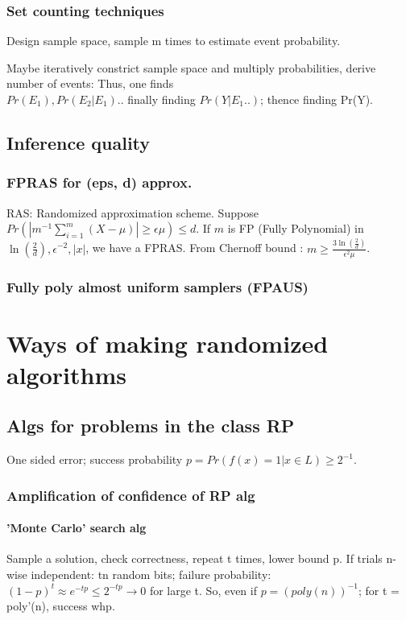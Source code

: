 \documentclass[oneside, article]{memoir}
\begin{document}
\subsection{Set counting techniques}
Design sample space, sample m times to estimate event probability.

Maybe iteratively constrict sample space and multiply probabilities, derive number of events: Thus, one finds \\$Pr(E_{1}), Pr(E_{2}| E_{1}) ..$ finally finding $Pr(Y|E_{1} .. )$; thence finding Pr(Y).

\section{Inference quality}
\subsection{FPRAS for (eps, d) approx.}
RAS: Randomized approximation scheme. Suppose $Pr(|m^{-1}\sum^{m}_{i=1} (X-\mu)|\geq \epsilon \mu) \leq d$. If $m$ is FP (Fully Polynomial) in $\ln(\frac{2}{d}), \epsilon^{-2}, |x|$, we have a FPRAS. From Chernoff bound : $m \geq \frac{3\ln(\frac{2}{d})}{\epsilon^{2}\mu}$.

\subsection{Fully poly almost uniform samplers (FPAUS)}
\tbc

\chapter{Ways of making randomized algorithms}
\section{Algs for problems in the class RP}
One sided error; success probability $p = Pr(f(x) = 1|x\in L) \geq 2^{-1}$.

\subsection{Amplification of confidence of RP alg}

\subsubsection{'Monte Carlo' search alg}
Sample a solution, check correctness, repeat t times, lower bound p. If trials n-wise independent: tn random bits; failure probability: $(1-p)^{t} \approx e^{-tp}\leq 2^{-tp} \to 0$ for large t. So, even if $p = (poly(n))^{-1}$; for t = poly'(n), success whp.
\end{document}
